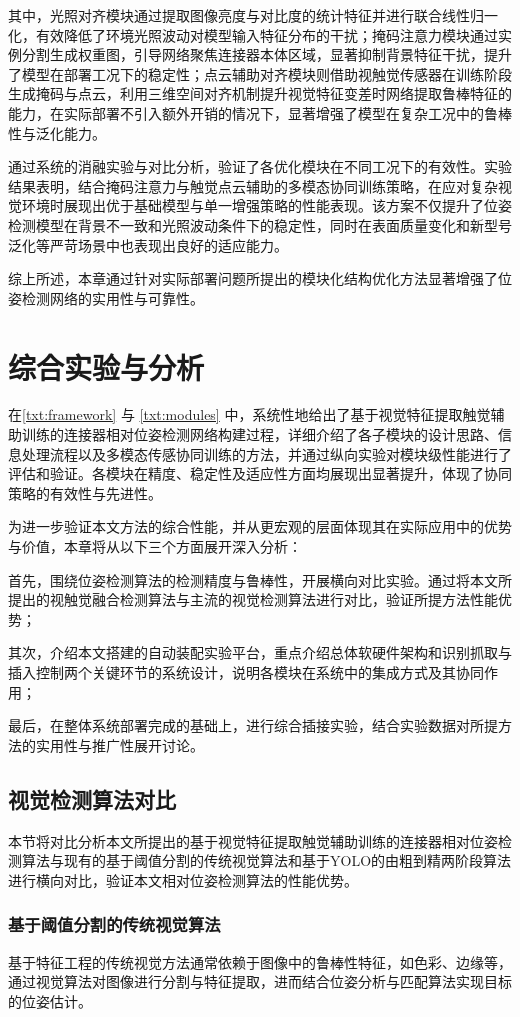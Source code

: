 \documentclass{Diploma}
\begin{document}
其中，光照对齐模块通过提取图像亮度与对比度的统计特征并进行联合线性归一化，有效降低了环境光照波动对模型输入特征分布的干扰；掩码注意力模块通过实例分割生成权重图，引导网络聚焦连接器本体区域，显著抑制背景特征干扰，提升了模型在部署工况下的稳定性；点云辅助对齐模块则借助视触觉传感器在训练阶段生成掩码与点云，利用三维空间对齐机制提升视觉特征变差时网络提取鲁棒特征的能力，在实际部署不引入额外开销的情况下，显著增强了模型在复杂工况中的鲁棒性与泛化能力。

通过系统的消融实验与对比分析，验证了各优化模块在不同工况下的有效性。实验结果表明，结合掩码注意力与触觉点云辅助的多模态协同训练策略，在应对复杂视觉环境时展现出优于基础模型与单一增强策略的性能表现。该方案不仅提升了位姿检测模型在背景不一致和光照波动条件下的稳定性，同时在表面质量变化和新型号泛化等严苛场景中也表现出良好的适应能力。

综上所述，本章通过针对实际部署问题所提出的模块化结构优化方法显著增强了位姿检测网络的实用性与可靠性。
\chapter[experiment]{综合实验与分析}
在\ref{txt:framework} 与 \ref{txt:modules} 中，系统性地给出了基于视觉特征提取触觉辅助训练的连接器相对位姿检测网络构建过程，详细介绍了各子模块的设计思路、信息处理流程以及多模态传感协同训练的方法，并通过纵向实验对模块级性能进行了评估和验证。各模块在精度、稳定性及适应性方面均展现出显著提升，体现了协同策略的有效性与先进性。

为进一步验证本文方法的综合性能，并从更宏观的层面体现其在实际应用中的优势与价值，本章将从以下三个方面展开深入分析：

首先，围绕位姿检测算法的检测精度与鲁棒性，开展横向对比实验。通过将本文所提出的视触觉融合检测算法与主流的视觉检测算法进行对比，验证所提方法性能优势；

其次，介绍本文搭建的自动装配实验平台，重点介绍总体软硬件架构和识别抓取与插入控制两个关键环节的系统设计，说明各模块在系统中的集成方式及其协同作用；

最后，在整体系统部署完成的基础上，进行综合插接实验，结合实验数据对所提方法的实用性与推广性展开讨论。
\section{视觉检测算法对比}
本节将对比分析本文所提出的基于视觉特征提取触觉辅助训练的连接器相对位姿检测算法与现有的基于阈值分割的传统视觉算法和基于YOLO的由粗到精两阶段算法进行横向对比，验证本文相对位姿检测算法的性能优势。
\subsection{基于阈值分割的传统视觉算法}
基于特征工程的传统视觉方法通常依赖于图像中的鲁棒性特征，如色彩、边缘等，通过视觉算法对图像进行分割与特征提取，进而结合位姿分析与匹配算法实现目标的位姿估计。
\end{document}
